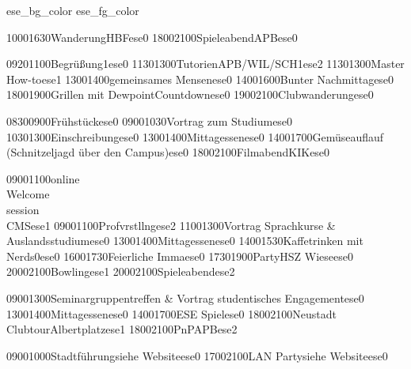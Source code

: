 \documentclass[a5paper,7pt]{scrreprt}
\begin{document}
\thispagestyle{empty}

\setslotsize{3.00cm}{0.25cm}
\settextframe{0.8mm}

\seteventcornerradius{0pt}



%
  {ese_bg_color}
  {ese_fg_color}
\begin{center}
\begin{timetable}

   {1000}{1630}{Wanderung}{}{HBF}{}{ese}{0}
   {1800}{2100}{Spieleabend}{}{APB}{}{ese}{0}

   {0920}{1100}{Begrüßung}{}{}{1}{ese}{0}
   {1130}{1300}{Tutorien}{}{APB/WIL/SCH}{1}{ese}{2}
   {1130}{1300}{Master\\How-to}{}{}{}{ese}{1}
   {1300}{1400}{gemeinsames Mensen}{}{}{}{ese}{0}
   {1400}{1600}{Bunter Nachmittag}{}{}{}{ese}{0}
   {1800}{1900}{Grillen mit Dewpoint}{}{Countdown}{}{ese}{0}
   {1900}{2100}{Clubwanderung}{}{}{}{ese}{0}

   {0830}{0900}{Frühstück}{}{}{}{ese}{0}
   {0900}{1030}{Vortrag zum Studium}{}{}{}{ese}{0}
   {1030}{1300}{Einschreibung}{}{}{}{ese}{0}
   {1300}{1400}{Mittagessen}{}{}{}{ese}{0}
   {1400}{1700}{Gemüseauflauf (Schnitzeljagd über den Campus)}{}{}{}{ese}{0}
   {1800}{2100}{Filmabend}{}{KIK}{}{ese}{0}


   {0900}{1100}{online\\Welcome\\session\\CMS}{}{}{}{ese}{1}
   {0900}{1100}{Profvrstllng}{}{}{}{ese}{2}
   {1100}{1300}{Vortrag Sprachkurse \& Auslandsstudium}{}{}{}{ese}{0}
   {1300}{1400}{Mittagessen}{}{}{}{ese}{0}
   {1400}{1530}{Kaffetrinken mit Nerds}{}{}{0}{ese}{0}
   {1600}{1730}{Feierliche Imma}{}{}{}{ese}{0}
   {1730}{1900}{Party}{}{HSZ Wiese}{}{ese}{0}
   {2000}{2100}{Bowling}{}{}{}{ese}{1}
   {2000}{2100}{Spieleabend}{}{}{}{ese}{2}

   {0900}{1300}{Seminargruppentreffen \& Vortrag studentisches Engagement}{}{}{}{ese}{0}
   {1300}{1400}{Mittagessen}{}{}{}{ese}{0}
   {1400}{1700}{ESE Spiel}{}{}{}{ese}{0}
   {1800}{2100}{Neustadt\\ Clubtour}{}{Albertplatz}{}{ese}{1}
   {1800}{2100}{PnP}{}{APB}{}{ese}{2}
  
   {0900}{1000}{Stadtführung}{}{siehe Website}{}{ese}{0}
   {1700}{2100}{LAN Party}{}{siehe Website}{}{ese}{0}
\end{timetable}
\end{center}
\end{document}
